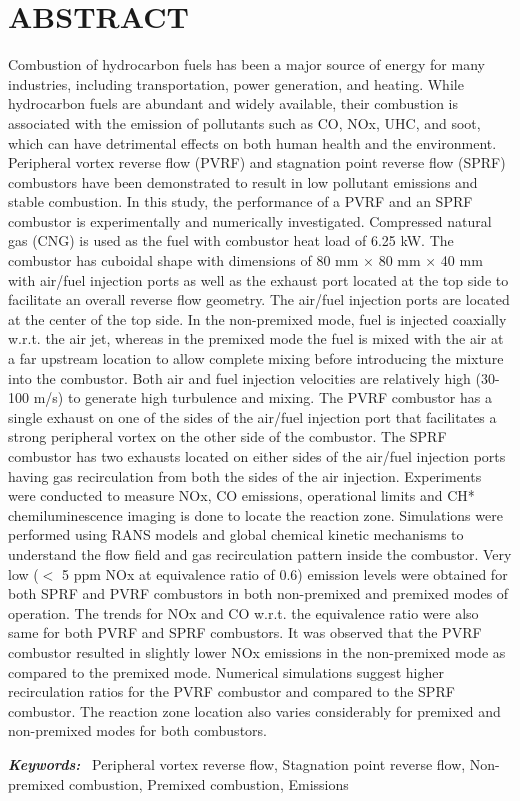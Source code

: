 \chapter*{ABSTRACT}
Combustion of hydrocarbon fuels has been a major source of energy for many industries, including transportation, power generation, and heating. While hydrocarbon fuels are abundant and widely available, their combustion is associated with the emission of pollutants such as CO, NOx, UHC, and soot, which can have detrimental effects on both human health and the environment. Peripheral vortex reverse flow (PVRF) and stagnation point reverse flow (SPRF) combustors have been demonstrated to result in low pollutant emissions and stable combustion. In this study, the performance of a PVRF and an SPRF combustor is experimentally and numerically investigated. Compressed natural gas (CNG) is used as the fuel with combustor heat load of 6.25 kW. The combustor has cuboidal shape with dimensions of 80 mm × 80 mm × 40 mm with air/fuel injection ports as well as the exhaust port located at the top side to facilitate an overall reverse flow geometry. The air/fuel injection ports are located at the center of the top side. In the non-premixed mode, fuel is injected coaxially w.r.t. the air jet, whereas in the premixed mode the fuel is mixed with the air at a far upstream location to allow complete mixing before introducing the mixture into the combustor. Both air and fuel injection velocities are relatively high (30-100 m/s) to generate high turbulence and mixing. The PVRF combustor has a single exhaust on one of the sides of the air/fuel injection port that facilitates a strong peripheral vortex on the other side of the combustor. The SPRF combustor has two exhausts located on either sides of the air/fuel injection ports having gas recirculation from both the sides of the air injection. Experiments were conducted to measure NOx, CO emissions, operational limits and CH* chemiluminescence imaging is done to locate the reaction zone. Simulations were performed using RANS models and global chemical kinetic mechanisms to understand the flow field and gas recirculation pattern inside the combustor. Very low ($ < $ 5 ppm NOx at equivalence ratio of 0.6) emission levels were obtained for both SPRF and PVRF combustors in both non-premixed and premixed modes of operation. The trends for NOx and CO w.r.t. the equivalence ratio were also same for both PVRF and SPRF combustors. It was observed that the PVRF combustor resulted in slightly lower NOx emissions in the non-premixed mode as compared to the premixed mode. Numerical simulations suggest higher recirculation ratios for the PVRF combustor and compared to the SPRF combustor. The reaction zone location also varies considerably for premixed and non-premixed modes for both combustors.


\vspace*{0.7cm}
\noindent
{\large{\textbf{\emph{Keywords:}}}}~
Peripheral vortex reverse flow, Stagnation point reverse flow, Non-premixed combustion, Premixed combustion, Emissions








